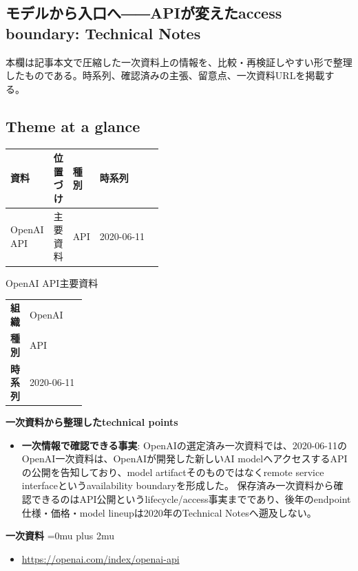 \subsection*{モデルから入口へ――APIが変えたaccess boundary: Technical Notes}
本欄は記事本文で圧縮した一次資料上の情報を、比較・再検証しやすい形で整理したものである。時系列、確認済みの主張、留意点、一次資料URLを掲載する。
\smallskip
{}\par
\medskip
\subsection*{Theme at a glance}
\begin{center}
\footnotesize
\begin{tabularx}{\linewidth}{@{}p{0.20\linewidth}p{0.10\linewidth}p{0.14\linewidth}X@{}}
\toprule
資料 & 位置づけ & 種別 & 時系列 \\
\midrule
OpenAI API & 主要資料 & API & 2020-06-11 \\
\bottomrule
\end{tabularx}
\end{center}
\normalsize

\begin{technicalnote}{OpenAI API}{主要資料}
\begingroup
\begin{tabularx}{\linewidth}{@{}>{\bfseries}p{0.22\linewidth}X@{}}
組織 & OpenAI \\
種別 & API \\
時系列 & 2020-06-11 \\
\end{tabularx}
\smallskip
\begin{minipage}{\linewidth}
{\bfseries 一次資料から整理したtechnical points}
\begin{itemize}[leftmargin=1.5em,itemsep=0.35em]
\item \textbf{一次情報で確認できる事実}: OpenAIの選定済み一次資料では、2020-06-11のOpenAI一次資料は、OpenAIが開発した新しいAI modelへアクセスするAPIの公開を告知しており、model artifactそのものではなくremote service interfaceというavailability boundaryを形成した。 保存済み一次資料から確認できるのはAPI公開というlifecycle/access事実までであり、後年のendpoint仕様・価格・model lineupは2020年のTechnical Notesへ遡及しない。
\end{itemize}
\begin{samepage}
{\bfseries 一次資料}
\begingroup\sloppy
\Urlmuskip=0mu plus 2mu\relax
\begin{itemize}[leftmargin=1.5em,itemsep=0.25em]
\item {\scriptsize\url{https://openai.com/index/openai-api}}
\end{itemize}
\endgroup
\end{samepage}
\end{minipage}
\endgroup
\end{technicalnote}
\medskip
